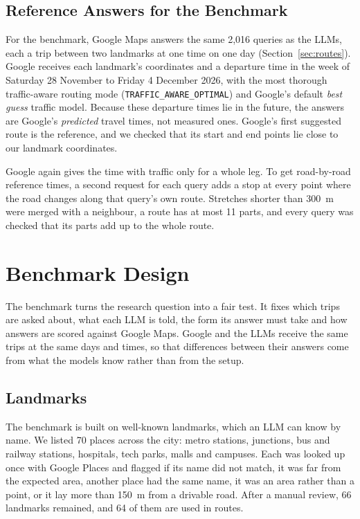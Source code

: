 \documentclass[conference]{IEEEtran}
\begin{document}
\subsection{Reference Answers for the Benchmark}\label{sec:reference}
For the benchmark, Google Maps answers the same 2,016 queries as the LLMs, each a trip between two landmarks at one time on one day (Section~\ref{sec:routes}). Google receives each landmark's coordinates and a departure time in the week of Saturday 28 November to Friday 4 December 2026, with the most thorough traffic-aware routing mode (\texttt{TRAFFIC\_AWARE\_OPTIMAL}) and Google's default \emph{best guess} traffic model. Because these departure times lie in the future, the answers are Google's \emph{predicted} travel times, not measured ones. Google's first suggested route is the reference, and we checked that its start and end points lie close to our landmark coordinates.

Google again gives the time with traffic only for a whole leg. To get road-by-road reference times, a second request for each query adds a stop at every point where the road changes along that query's own route. Stretches shorter than 300~m were merged with a neighbour, a route has at most 11 parts, and every query was checked that its parts add up to the whole route.

\section{Benchmark Design}\label{sec:design}

The benchmark turns the research question into a fair test. It fixes which trips are asked about, what each LLM is told, the form its answer must take and how answers are scored against Google Maps. Google and the LLMs receive the same trips at the same days and times, so that differences between their answers come from what the models know rather than from the setup.

\subsection{Landmarks}
The benchmark is built on well-known landmarks, which an LLM can know by name. We listed 70 places across the city: metro stations, junctions, bus and railway stations, hospitals, tech parks, malls and campuses. Each was looked up once with Google Places and flagged if its name did not match, it was far from the expected area, another place had the same name, it was an area rather than a point, or it lay more than 150~m from a drivable road. After a manual review, 66 landmarks remained, and 64 of them are used in routes.
\end{document}
